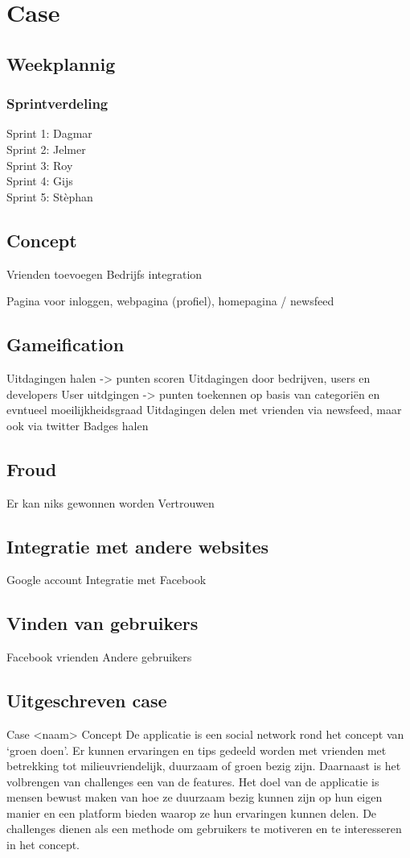 \documentclass[11pt,fleqn,oneside,openany]{book} %
\begin{document}
\chapter{Case}
\section{Weekplannig}
\subsection{Sprintverdeling}
Sprint 1: Dagmar \\
Sprint 2: Jelmer \\
Sprint 3: Roy \\
Sprint 4: Gijs \\
Sprint 5: Stèphan \\

\section{Concept}
Vrienden toevoegen
Bedrijfs integration

Pagina voor inloggen, webpagina (profiel), homepagina / newsfeed

\section{Gameification}
Uitdagingen halen -> punten scoren
Uitdagingen door bedrijven, users en developers
User uitdgingen -> punten toekennen op basis van categoriën en evntueel moeilijkheidsgraad
Uitdagingen delen met vrienden via newsfeed, maar ook via twitter
Badges halen

\section{Froud}
Er kan niks gewonnen worden
Vertrouwen

\section{Integratie met andere websites}
Google account
Integratie met Facebook

\section{Vinden van gebruikers}
Facebook vrienden
Andere gebruikers

\section{Uitgeschreven case}
Case <naam>
Concept
De applicatie is een social network rond het concept van ‘groen doen’. Er kunnen ervaringen en tips gedeeld worden met vrienden met betrekking tot milieuvriendelijk, duurzaam of groen bezig zijn. Daarnaast is het volbrengen van challenges een van de features. Het doel van de applicatie is mensen bewust maken van hoe ze duurzaam bezig kunnen zijn op hun eigen manier en een platform bieden waarop ze hun ervaringen kunnen delen. De challenges dienen als een methode om gebruikers te motiveren en te interesseren in het concept.
\end{document}
